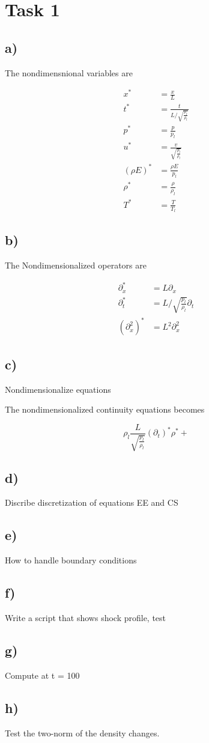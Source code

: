 \documentclass{article}
\newcommand{\tref}{\frac{L}{\sqrt{\frac{p_l}{\rho_l}}}}
\begin{document}

\section{Task 1}

\subsection{a)}
The nondimensnional variables are

\begin{align}
	x^* &= \frac{x}{L} \\
	t^* &= \frac{t}{L/\sqrt{\frac{p_l}{\rho_l}}} \\
	p^* &= \frac{p}{p_l} \\
	u^* &= \frac{v}{\sqrt{\frac{p_l}{\rho_l}}} \\
	(\rho E)^* &= \frac{\rho E}{p_l} \\
	\rho^* &= \frac{\rho}{\rho_l} \\
	T^* &= \frac{T}{T_l}
\end{align}

\subsection{b)}
The Nondimensionalized operators are

\begin{align}
	\partial_x^* &= L\partial_x \\
	\partial_t^* &= L/\sqrt{\frac{p_l}{\rho_l}} \partial_t \\
	(\partial_x^2)^* &= L^2 \partial_x^2
\end{align}

\subsection{c)}
Nondimensionalize equations

The nondimensionalized continuity equations becomes

\begin{equation}
 	\rho_l \tref (\partial_t)^* \rho^* + 
\end{equation}

\subsection{d)}
Discribe discretization of equations EE and CS

\subsection{e)}
How to handle boundary conditions

\subsection{f)}
Write a script that shows shock profile, test

\subsection{g)}
Compute at t = 100

\subsection{h)}
Test the two-norm of the density changes.
\end{document}
